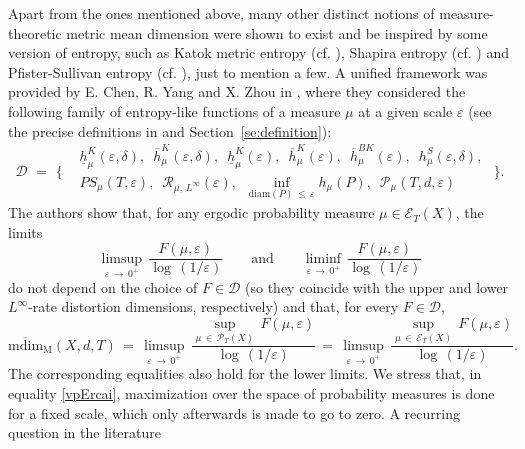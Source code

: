 \documentclass[11pt,a4paper,reqno]{amsart}
\theoremstyle{plain}
\theoremstyle{definition}
\newcommand{\ep} {\varepsilon}
\newcommand{\cP}{{\mathcal P}}
\newcommand{\cD}{{\mathcal D}}
\newcommand{\cE}{{\mathcal E}}
\newcommand{\cU}{{\mathcal U}}
\begin{document}
Apart from the ones mentioned above, many other distinct notions of measure-theoretic metric mean dimension were shown to exist and be inspired by some version of entropy, such as Katok metric entropy (cf. \cite{SHI}), Shapira entropy (cf. \cite{SHI}) and Pfister-Sullivan entropy (cf. \cite{Wang}), just to mention a few. A unified framework was provided by E. Chen, R. Yang and X. Zhou in \cite{EYZ2025}, where they considered the following family of entropy-like functions of a measure $\mu$ at a given scale $\ep$ (see the precise definitions in \cite{EYZ2025} and Section~\ref{se:definition}):
\begin{equation}\label{def:Dcal}
    \cD\,\,=\,\, \Bigg\{
\begin{aligned}
&\underline{h}_\mu^K(\ep,\delta),\,\,\,
\overline{h}_\mu^K(\ep,\delta),\,\,\,
\underline{h}_\mu^K(\ep),\,\,\,
\overline{h}_\mu^K(\ep),\,\,\,
\overline{h}_\mu^{BK}(\ep),\,\,\, 
h_\mu^S(\ep,\delta),\,\,
\\
&
PS_\mu(T,\ep),\,\,\,
{\mathcal{R}}_{\mu,\,L^\infty}(\ep),\,\,\,
\inf_{\mathrm{diam}(P)\,\le\, \varepsilon} h_\mu(P),\,\,\,
\cP_\mu(T,d,\ep)
\end{aligned}
\Bigg\}.
\end{equation} 
The authors show that, for any ergodic probability measure $\mu\in\cE_T(X)$, the limits 
\begin{equation}\label{Flimit}
 \limsup_{\varepsilon \, \to \, 0^+}\,\frac{F(\mu,\varepsilon)}{\log\,(1/\varepsilon)}\qquad\text{and}\qquad \liminf_{\varepsilon \, \to \, 0^+}\,\frac{F(\mu,\varepsilon)}{\log\,(1/\varepsilon)} 
\end{equation} 
do not depend on the choice of $F\in\cD$ (so they coincide with the upper and lower $L^\infty$-rate distortion dimensions, respectively) and that, for every $F\in\cD$,
\begin{equation}\label{vpErcai}
    \mathrm{\overline{mdim}_M}(X,d,T) \,=\, \limsup_{\varepsilon \, \to \, 0^+}\,\frac{\sup_{\mu \,\in\, \mathcal{P}_T(X)} \,F(\mu,\varepsilon)}{\log\,(1/\varepsilon)} \,=\, \limsup_{\varepsilon \, \to \, 0^+}\,\frac{\sup_{\mu \,\in\, \mathcal{E}_T(X)} \,F(\mu,\varepsilon)}{\log\,(1/\varepsilon)}.
\end{equation} 
The corresponding equalities also hold for the lower limits. We stress that, in equality \eqref{vpErcai}, maximization over the space of probability measures is done for a fixed scale, which only afterwards is made to go to zero. A recurring question in the literature 
\end{document}
